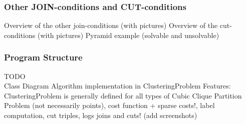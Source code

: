 \begin{frame}
    \frametitle{Other JOIN-conditions and CUT-conditions}
    Overview of the other join-conditions (with pictures)
    Overview of the cut-conditions (with pictures)
    Pyramid example (solvable and unsolvable)
\end{frame}

\begin{frame}
    \frametitle{Program Structure}
    TODO\\
    Class Diagram
    Algorithm implementation in ClusteringProblem
    Features: ClusteringProblem is generally defined for all types of Cubic Clique Partition Problem (not necessarily points),
        cost function + sparse costs!, label computation, cut triples,
        logs joins and cuts! (add screenshots)
\end{frame}






